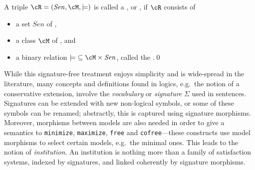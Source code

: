 \documentclass[10pt, a4paper]{isov2}
\newcommand*{\syntax}[1]{\texttt{#1}}
\begin{document}
\begin{definition}\label{def:room}
A triple $\cR=(\mathit{Sen},{\cM,\models)}$  is called a , or , if $\cR$ consists of
\begin{itemize}
\item a set $\mathit{Sen}$ of ,
\item a class
$\cM$ of , and
\item a binary relation
${\models} \subseteq \cM \times \mathit{Sen}$, called the .\quad\qed
\end{itemize}
\end{definition}


While this signature-free treatment enjoys simplicity and is wide-spread in the literature, many 
concepts and definitions found in logics, e.g.\ the notion of a conservative extension, involve the
\emph{vocabulary} or \emph{signature} $\Sigma$ \label{vocabulary} used in sentences.  Signatures 
can be extended with new non-logical symbols, or some of these symbols can be renamed; abstractly, 
this is captured using signature morphisms. Moreover,  morphisms
between models are also needed in order to give a semantics to \syntax{minimize},
\syntax{maximize}, \syntax{free} and \syntax{cofree}---these constructs
use model morphisms to select certain models, e.g.\ the minimal ones.
This leads to the notion of \emph{institution}. An institution
is nothing more than a family of satisfaction systems, indexed by
signatures, and linked coherently by signature morphisms.
\end{document}

